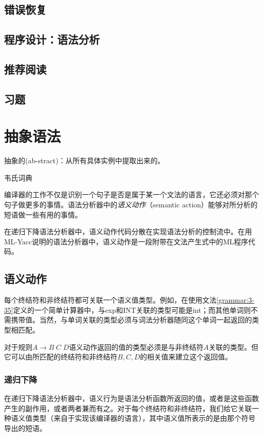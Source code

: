\documentclass[cn,11pt,chinese]{elegantbook}
\begin{document}
\section{错误恢复}

\section{程序设计：语法分析}

\section{推荐阅读}

\section{习题}

\chapter{抽象语法}

\epigraph{抽象的(ab-stract)：从所有具体实例中提取出来的。}{韦氏词典}

编译器的工作不仅是识别一个句子是否是属于某一个文法的语言，它还必须对那个句子做更多的事情。语法分析器中的\textit{语义动作}（semantic action）能够对所分析的短语做一些有用的事情。

在递归下降语法分析器中，语义动作代码分散在实现语法分析的控制流中。在用ML-Yacc说明的语法分析器中，语义动作是一段附带在文法产生式中的ML程序代码。

\section{语义动作}

每个终结符和非终结符都可关联一个语义值类型。例如，在使用文法\ref{grammar:3-35}定义的一个简单计算器中，与exp和INT关联的类型可能是int；而其他单词则不需携带值。当然，与单词关联的类型必须与词法分析器随同这个单词一起返回的类型相匹配。

对于规则$A\rightarrow B\;C\;D$语义动作返回的值的类型必须是与非终结符$A$关联的类型。但它可以由所匹配的终结符和非终结符$B,C,D$的相关值来建立这个返回值。

\subsection{递归下降}

在递归下降语法分析器中，语义行为是语法分析函数所返回的值，或者是这些函数产生的副作用，或者两者兼而有之。对于每个终结符和非终结符，我们给它关联一种语义值类型（来自于实现该编译器的语言），其中语义值所表示的是由那个符号导出的短语。
\end{document}
